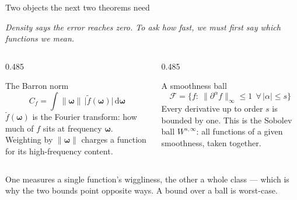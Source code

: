 \documentclass[aspectratio=169, 11pt]{beamer}
\newcommand{\bridge}[1]{%
  {\scriptsize\itshape\color{mcMuted} #1\par}\vspace{0.35em}}
\newcommand{\src}[3]{}      %
\begin{document}
\begin{frame}{Two objects the next two theorems need}
  \src{barron1993}{section}{III}
  \src{devore1989}{section}{4}
  \vspace{0.1em}
  \bridge{Density says the error reaches zero. To ask \emph{how fast},
  we must first say which functions we mean.}
  \begin{columns}[T, onlytextwidth]
    \begin{column}{0.485\textwidth}
      \begin{block}{The Barron norm}
        {\scriptsize
        \[ C_f=\int \lVert\bm\omega\rVert\,
           \big|\tilde f(\bm\omega)\big|\,\mathrm{d}\bm\omega \]
        $\tilde f(\bm\omega)$ is the Fourier transform: how much of $f$
        sits at frequency $\bm\omega$. Weighting by
        $\lVert\bm\omega\rVert$ \alert{charges a function for its
        high-frequency content}.}
      \end{block}

    \end{column}
    \hfill
    \begin{column}{0.485\textwidth}
      \begin{block}{A smoothness ball}
        {\scriptsize
        \[ \mathcal{F}=\big\{f:\ \lVert \partial^{\alpha}f
           \rVert_\infty\leq 1 \ \ \forall\,|\alpha|\leq s\big\} \]
        Every derivative up to order $s$ is bounded by one. This is the
        Sobolev ball $W^{s,\infty}$: \alert{all functions of a given
        smoothness, taken together}.}
      \end{block}

    \end{column}
  \end{columns}
  \vspace{-0.1em}
  \begin{redhighlight}
    {\footnotesize One measures a \alert{single} function's
    wiggliness, the other a \alert{whole class} --- which is why the two
    bounds point opposite ways. A bound over a ball is worst-case.}
  \end{redhighlight}
\end{frame}
\end{document}
